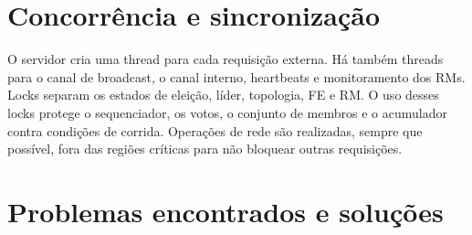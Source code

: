 \documentclass[12pt,a4paper]{article}
\begin{document}
\section{Concorrência e sincronização}

O servidor cria uma thread para cada requisição externa. Há também threads para
o canal de broadcast, o canal interno, heartbeats e monitoramento dos RMs. Locks
separam os estados de eleição, líder, topologia, FE e RM. O uso desses locks
protege o sequenciador, os votos, o conjunto de membros e o acumulador contra
condições de corrida. Operações de rede são realizadas, sempre que possível,
fora das regiões críticas para não bloquear outras requisições.

\section{Problemas encontrados e soluções}
\end{document}

